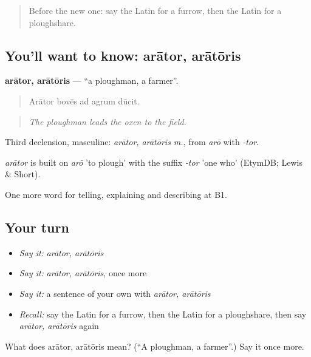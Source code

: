 \begin{quote}
Before the new one: say the Latin for a furrow, then the Latin for a ploughshare.
\end{quote}

\subsection*{You'll want to know: arātor, arātōris}
\textbf{arātor, arātōris} — \textquotedblleft{}a ploughman, a farmer\textquotedblright{}.

\begin{quote}
Arātor bovēs ad agrum dūcit.
\end{quote}

\begin{quote}
\emph{The ploughman leads the oxen to the field.}
\end{quote}

Third declension, masculine: \emph{arātor, arātōris m.}, from \emph{arō} with \emph{-tor}.

\begin{cousinweb}
\emph{arātor} is built on \emph{arō} 'to plough' with the suffix \emph{-tor} 'one who' (EtymDB; Lewis \& Short).
\end{cousinweb}

\begin{grammarlens}[title={What you've built}]
One more word for telling, explaining and describing at B1.
\end{grammarlens}

\subsection*{Your turn}
\begin{itemize}
\raggedright
  \item \emph{Say it:} \emph{arātor, arātōris}
  \item \emph{Say it:} \emph{arātor, arātōris}, once more
  \item \emph{Say it:} a sentence of your own with \emph{arātor, arātōris}
  \item \emph{Recall:} say the Latin for a furrow, then the Latin for a ploughshare, then say \emph{arātor, arātōris} again
\end{itemize}

\begin{tcolorbox}[breakable,colback=teal!4,colframe=teal!35!black,title={Before you move on}]
What does arātor, arātōris mean? (\textquotedblleft{}A ploughman, a farmer\textquotedblright{}.) Say it once more.
\end{tcolorbox}
